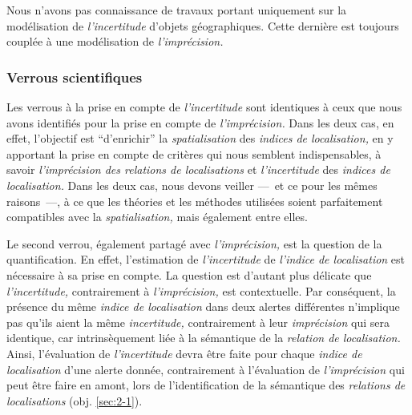 Nous n'avons pas connaissance de travaux portant uniquement sur la
modélisation de \emph{l'incertitude} d'objets géographiques. Cette
dernière est toujours couplée à une modélisation de
\emph{l'imprécision.}

\subsubsection{Verrous scientifiques}

Les verrous à la prise en compte de \emph{l'incertitude} sont
identiques à ceux que nous avons identifiés pour la prise en compte de
\emph{l'imprécision.} Dans les deux cas, en effet, l'objectif est
\enquote{d'enrichir} la \emph{spatialisation} des \emph{indices de
  localisation,} en y apportant la prise en compte de critères qui
nous semblent indispensables, à savoir \emph{l'imprécision des
  relations de localisations} et \emph{l'incertitude} des
\emph{indices de localisation.} Dans les deux cas, nous devons veiller
---~et ce pour les mêmes raisons~---, à ce que les théories et les
méthodes utilisées soient parfaitement compatibles avec la
\emph{spatialisation,} mais également entre elles.

Le second verrou, également partagé avec \emph{l'imprécision,} est la
question de la quantification. En effet, l'estimation de
\emph{l'incertitude} de \emph{l'indice de localisation} est nécessaire
à sa prise en compte. La question est d'autant plus délicate que
\emph{l'incertitude,} contrairement à \emph{l'imprécision,} est
contextuelle. Par conséquent, la présence du même \emph{indice de
  localisation} dans deux alertes différentes n'implique pas qu'ils
aient la même \emph{incertitude,} contrairement à leur
\emph{imprécision} qui sera identique, car intrinsèquement liée à la
sémantique de la \emph{relation de localisation.} Ainsi, l'évaluation
de \emph{l'incertitude} devra être faite pour chaque \emph{indice de
  localisation} d'une alerte donnée, contrairement à l'évaluation de
\emph{l'imprécision} qui peut être faire en amont, lors de
l’identification de la sémantique des \emph{relations de
  localisations} (obj. \ref{sec:2-1}).

